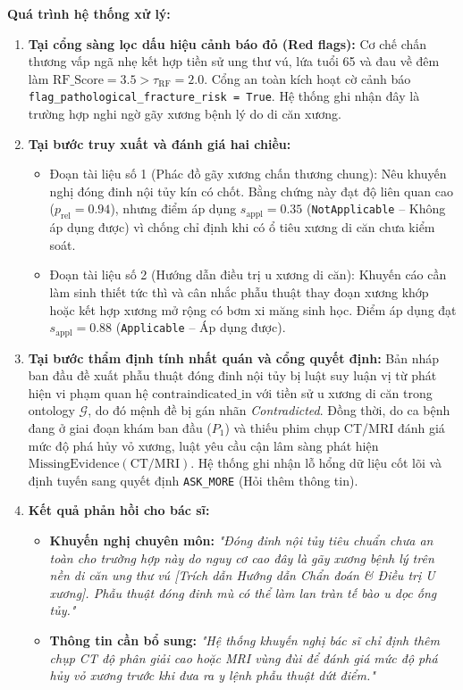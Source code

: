 \textbf{Quá trình hệ thống xử lý:}
\begin{enumerate}
    \item \textbf{Tại cổng sàng lọc dấu hiệu cảnh báo đỏ (Red flags):} Cơ chế chấn thương vấp ngã nhẹ kết hợp tiền sử ung thư vú, lứa tuổi 65 và đau về đêm làm $\mathrm{RF\_Score} = 3.5 > \tau_{\mathrm{RF}} = 2.0$. Cổng an toàn kích hoạt cờ cảnh báo \texttt{flag\_pathological\_fracture\_risk = True}. Hệ thống ghi nhận đây là trường hợp nghi ngờ gãy xương bệnh lý do di căn xương.
    \item \textbf{Tại bước truy xuất và đánh giá hai chiều:}
    \begin{itemize}
        \item Đoạn tài liệu số 1 (Phác đồ gãy xương chấn thương chung): Nêu khuyến nghị đóng đinh nội tủy kín có chốt. Bằng chứng này đạt độ liên quan cao ($p_{\mathrm{rel}} = 0.94$), nhưng điểm áp dụng $s_{\mathrm{appl}} = 0.35$ (\texttt{NotApplicable} -- Không áp dụng được) vì chống chỉ định khi có ổ tiêu xương di căn chưa kiểm soát.
        \item Đoạn tài liệu số 2 (Hướng dẫn điều trị u xương di căn): Khuyến cáo cần làm sinh thiết tức thì và cân nhắc phẫu thuật thay đoạn xương khớp hoặc kết hợp xương mở rộng có bơm xi măng sinh học. Điểm áp dụng đạt $s_{\mathrm{appl}} = 0.88$ (\texttt{Applicable} -- Áp dụng được).
    \end{itemize}
    \item \textbf{Tại bước thẩm định tính nhất quán và cổng quyết định:} Bản nháp ban đầu đề xuất phẫu thuật đóng đinh nội tủy bị luật suy luận vị từ phát hiện vi phạm quan hệ $\mathrm{contraindicated\_in}$ với tiền sử u xương di căn trong ontology $\mathcal{G}$, do đó mệnh đề bị gán nhãn \emph{Contradicted}. Đồng thời, do ca bệnh đang ở giai đoạn khám ban đầu ($P_1$) và thiếu phim chụp CT/MRI đánh giá mức độ phá hủy vỏ xương, luật yêu cầu cận lâm sàng phát hiện $\mathrm{MissingEvidence}(\text{CT/MRI})$. Hệ thống ghi nhận lỗ hổng dữ liệu cốt lõi và định tuyến sang quyết định \texttt{ASK\_MORE} (Hỏi thêm thông tin).
    \item \textbf{Kết quả phản hồi cho bác sĩ:}
    \begin{itemize}
        \item \textbf{Khuyến nghị chuyên môn:} \textit{"Đóng đinh nội tủy tiêu chuẩn chưa an toàn cho trường hợp này do nguy cơ cao đây là gãy xương bệnh lý trên nền di căn ung thư vú [Trích dẫn Hướng dẫn Chẩn đoán \& Điều trị U xương]. Phẫu thuật đóng đinh mù có thể làm lan tràn tế bào u dọc ống tủy."}
        \item \textbf{Thông tin cần bổ sung:} \textit{"Hệ thống khuyến nghị bác sĩ chỉ định thêm chụp CT độ phân giải cao hoặc MRI vùng đùi để đánh giá mức độ phá hủy vỏ xương trước khi đưa ra y lệnh phẫu thuật dứt điểm."}

\end{itemize}
\end{enumerate}
